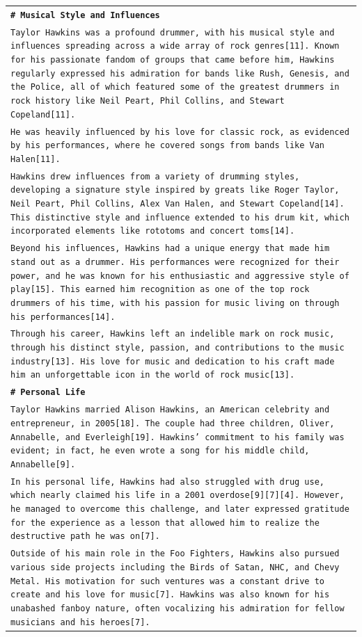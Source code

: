\begin{longtable}{p{\textwidth}}
\vspace{1pt}
\texttt{\small{\textbf{\# Musical Style and Influences}}} \\
\texttt{\small{Taylor Hawkins was a profound drummer, with his musical style and influences spreading across a wide array of rock genres[11]. Known for his passionate fandom of groups that came before him, Hawkins regularly expressed his admiration for bands like Rush, Genesis, and the Police, all of which featured some of the greatest drummers in rock history like Neil Peart, Phil Collins, and Stewart Copeland[11].}} \\
\texttt{\small{He was heavily influenced by his love for classic rock, as evidenced by his performances, where he covered songs from bands like Van Halen[11].}} \\
\texttt{\small{Hawkins drew influences from a variety of drumming styles, developing a signature style inspired by greats like Roger Taylor, Neil Peart, Phil Collins, Alex Van Halen, and Stewart Copeland[14]. This distinctive style and influence extended to his drum kit, which incorporated elements like rototoms and concert toms[14].}} \\
\texttt{\small{Beyond his influences, Hawkins had a unique energy that made him stand out as a drummer. His performances were recognized for their power, and he was known for his enthusiastic and aggressive style of play[15]. This earned him recognition as one of the top rock drummers of his time, with his passion for music living on through his performances[14].}} \\
\texttt{\small{Through his career, Hawkins left an indelible mark on rock music, through his distinct style, passion, and contributions to the music industry[13]. His love for music and dedication to his craft made him an unforgettable icon in the world of rock music[13].}} \\

\vspace{1pt}
\texttt{\small{\textbf{\# Personal Life}}} \\
\texttt{\small{Taylor Hawkins married Alison Hawkins, an American celebrity and entrepreneur, in 2005[18]. The couple had three children, Oliver, Annabelle, and Everleigh[19]. Hawkins' commitment to his family was evident; in fact, he even wrote a song for his middle child, Annabelle[9].}} \\
\texttt{\small{In his personal life, Hawkins had also struggled with drug use, which nearly claimed his life in a 2001 overdose[9][7][4]. However, he managed to overcome this challenge, and later expressed gratitude for the experience as a lesson that allowed him to realize the destructive path he was on[7].}} \\
\texttt{\small{Outside of his main role in the Foo Fighters, Hawkins also pursued various side projects including the Birds of Satan, NHC, and Chevy Metal. His motivation for such ventures was a constant drive to create and his love for music[7]. Hawkins was also known for his unabashed fanboy nature, often vocalizing his admiration for fellow musicians and his heroes[7].}} \\


\end{longtable}
